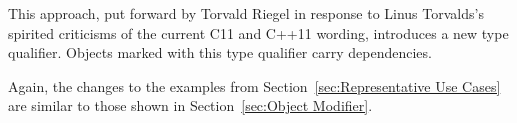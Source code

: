 This approach, put forward by Torvald Riegel in response to
Linus Torvalds's spirited criticisms of the current C11 and C++11
wording, introduces a new  type qualifier.
Objects marked with this type qualifier carry dependencies.

Again, the changes to the examples from
Section~\ref{sec:Representative Use Cases}
are similar to those shown in
Section~\ref{sec:Object Modifier}.
